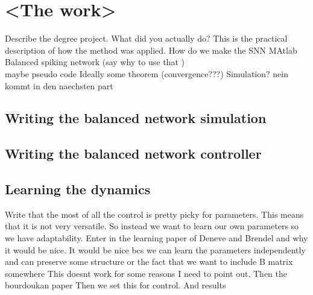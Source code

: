 	\chapter{<The work>}

Describe the degree project. What did you actually do? This is the practical description of how the method was applied.
How do we make the SNN
MAtlab
Balanced spiking network (say why to use that )\\
maybe pseudo code
Ideally some theorem (convergence???)
Simulation? nein kommt in den naechsten part

\section{Writing the balanced network simulation}

\section{Writing the balanced network controller}


\section{Learning the dynamics}
Write that the most of all the control is pretty picky for parameters.
This means that it is not very versatile.
So instead we want to learn our own parameters so we have adaptability.
Enter in the learning paper of Deneve and Brendel and why it would be nice. It would be nice bcs we can learn the parameters independently and can preserve some structure or the fact that we want to include B matrix somewhere
This doesnt work for some reasons I need to point out.
Then the bourdoukan paper
Then we set this for control.
And results
